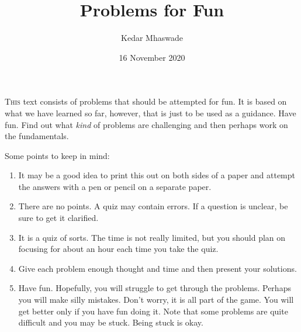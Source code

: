\documentclass[12pt]{exam}         %
\title{Problems for Fun}
\author{Kedar Mhaswade}
\date{16 November 2020}
\begin{document}
\maketitle

\lettrine[lines=3]{T}{his} text consists of problems that should be attempted for fun. It is based on what we have learned
so far, however, that is just to be used as a guidance. Have fun. Find out what \emph{kind} of problems
are challenging and then perhaps work on the fundamentals.

Some points to keep in mind:
\begin{enumerate}
\item It may be a good idea to print this out on both sides of a paper and attempt the answers with a pen or pencil on a separate paper.
\item There are no points. A quiz may contain errors. If a question is unclear, be sure to get it clarified.
\item It is a quiz of sorts. The time is not really limited, but you should plan on focusing for about an hour each time you take the quiz.
\item Give each problem enough thought and time and then present your solutions.
\item Have fun. Hopefully, you will struggle to get through the problems. Perhaps you will make silly mistakes. Don't worry, it is all part of the game. You will get better only if you have fun doing it. Note that some problems are quite difficult and you may be stuck. Being stuck is okay.
\end{enumerate}
\end{document}
